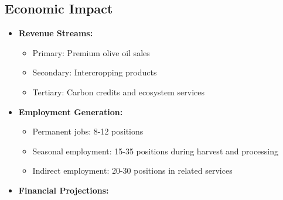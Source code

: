 \subsection{Economic Impact}
\begin{itemize}
    \item \textbf{Revenue Streams:}
    \begin{itemize}
        \item Primary: Premium olive oil sales
        \item Secondary: Intercropping products
        \item Tertiary: Carbon credits and ecosystem services
    \end{itemize}
    
    \item \textbf{Employment Generation:}
    \begin{itemize}
        \item Permanent jobs: 8-12 positions
        \item Seasonal employment: 15-35 positions during harvest and processing
        \item Indirect employment: 20-30 positions in related services
    \end{itemize}
    
    \item \textbf{Financial Projections:}
\end{itemize}

